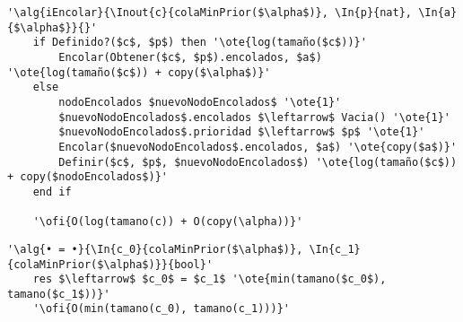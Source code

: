 	\begin{lstlisting}[mathescape]
	'\alg{iEncolar}{\Inout{c}{colaMinPrior($\alpha$)}, \In{p}{nat}, \In{a}{$\alpha$}}{}'
	if Definido?($c$, $p$) then '\ote{log(tamaño($c$))}'
		Encolar(Obtener($c$, $p$).encolados, $a$) '\ote{log(tamaño($c$)) + copy($\alpha$)}'
	else
		nodoEncolados $nuevoNodoEncolados$ '\ote{1}'
		$nuevoNodoEncolados$.encolados $\leftarrow$ Vacia() '\ote{1}'
		$nuevoNodoEncolados$.prioridad $\leftarrow$ $p$ '\ote{1}'
		Encolar($nuevoNodoEncolados$.encolados, $a$) '\ote{copy($a$)}'
		Definir($c$, $p$, $nuevoNodoEncolados$) '\ote{log(tamaño($c$)) + copy($nodoEncolados$)}'
	end if

	'\ofi{O(log(tamano(c)) + O(copy(\alpha))}'
	\end{lstlisting}

	\begin{lstlisting}[mathescape]
	'\alg{• = •}{\In{c_0}{colaMinPrior($\alpha$)}, \In{c_1}{colaMinPrior($\alpha$)}}{bool}'
	res $\leftarrow$ $c_0$ = $c_1$ '\ote{min(tamano($c_0$), tamano($c_1$))}'
	'\ofi{O(min(tamano(c_0), tamano(c_1)))}'
	\end{lstlisting}


